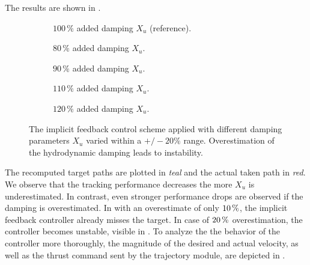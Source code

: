 The results are shown in .
\begin{figure}
	\centering
	\begin{subfigure}[t]{0.49\textwidth}
		\centering
		
		\caption{$100\,\%$ added damping $X_u$ (reference).}
	\end{subfigure}
 
    \vspace{0.7cm}
    \begin{subfigure}[t]{0.49\textwidth}
		\centering
		
		\caption{$80\,\%$ added damping $X_u$.}
	\end{subfigure}
	\begin{subfigure}[t]{0.49\textwidth}
		\centering
		
		\caption{$90\,\%$ added damping $X_u$.}
	\end{subfigure}
 
    \vspace{0.7cm}
	\begin{subfigure}[t]{0.49\textwidth}
		\centering
		
		\caption{$110\,\%$ added damping $X_u$.}
        \label{fig:slightly-overestimated-damping}
	\end{subfigure}
	\begin{subfigure}[t]{0.49\textwidth}
		\centering
		
		\caption{$120\,\%$ added damping $X_u$.}
        \label{fig:even-more-slightly-overestimated-damping}
	\end{subfigure}
	\caption{The implicit feedback control scheme applied with different damping parameters $X_u$ varied within a $+/-20\%$ range. Overestimation of the hydrodynamic damping leads to instability.}
    \label{fig:damping_analysis}
\end{figure}
The recomputed target paths are plotted in \textit{teal} and the actual taken path in \textit{red}.
We observe that the tracking performance decreases the more $X_u$ is underestimated. In contrast, even stronger performance drops are observed if the damping is overestimated. In  with an overestimate of only $\unit[10]{\%}$, the implicit feedback controller already misses the target. In case of $\unit[20]{\%}$ overestimation, the controller becomes unstable, visible in . To analyze the the behavior of the controller more thoroughly, the magnitude of the desired and actual velocity, as well as the thrust command sent by the trajectory module, are depicted in .
